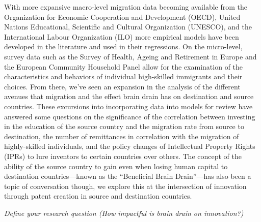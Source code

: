 \documentclass[12pt]{article}
\newcommand{\pointer}[1]{{\color{red} \center \textit{#1}}}
\begin{document}
With more expansive macro-level migration data becoming available from the Organization for Economic Cooperation and Development (OECD), United Nations Educational, Scientific and Cultural Organization (UNESCO), and the International Labour Organization (ILO) more empirical models have been developed in the literature and used in their regressions.
On the micro-level, survey data such as the Survey of Health, Ageing and Retirement in Europe and the European Community Household Panel allow for the examination of the characteristics and behaviors of individual high-skilled immigrants and their choices.
From there, we've seen an expansion in the analysis of the different avenues that migration and the effect brain drain has on destination and source countries.
These excursions into incorporating data into models for review have answered some questions on the significance of the correlation between investing in the education of the source country and the migration rate from source to destination, the number of remittances in correlation with the migration of highly-skilled individuals, and the policy changes of Intellectual Property Rights (IPRs) to lure inventors to certain countries over others.
The concept of the ability of the source country to gain even when losing human capital to destination countries—known as the ``Beneficial Brain Drain''—has also been a topic of conversation though, we explore this at the intersection of innovation through patent creation in source and destination countries.


\pointer{Define your research question (How impactful is brain drain on innovation?)}
\end{document}
